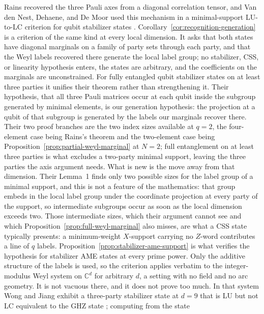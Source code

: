 Rains recovered the three Pauli axes from a diagonal correlation tensor,
and Van den Nest, Dehaene, and De Moor used this mechanism in a
minimal-support LU-to-LC criterion for qubit stabilizer states
\cite[Theorem~13]{Rains1999}
\cite[Theorem~1 and Corollary~1]{VanDenNestDehaeneDeMoor2005}.
Corollary~\ref{cor:recognition-generation} is a criterion of the same kind
at every local dimension.  It asks that both states have diagonal marginals
on a family of party sets through each party, and that the Weyl labels
recovered there generate the local label group; no stabilizer, CSS, or
linearity hypothesis enters, the states are arbitrary, and the coefficients
on the marginals are unconstrained.
For fully entangled qubit stabilizer states on at least three parties it
unifies their theorem rather than strengthening it.  Their hypothesis, that
all three Pauli matrices occur at each qubit inside the subgroup generated
by minimal elements, is our generation hypothesis: the projection at a qubit
of that subgroup is generated by the labels our marginals recover there.
Their two proof branches are the two index sizes available at \(q=2\), the
four-element case being Rains's theorem and the two-element case being
Proposition~\ref{prop:partial-weyl-marginal} at \(N=2\); full entanglement
on at least three parties is what excludes a two-party minimal support,
leaving the three parties the axis argument needs.
What is new is the move away from that dimension.  Their Lemma~1 finds only
two possible sizes for the label group of a minimal support, and this is not
a feature of the mathematics: that group embeds in the local label group
under the coordinate projection at every party of the support, so
intermediate subgroups occur as soon as the local dimension exceeds two.
Those intermediate sizes, which their argument cannot see and which
Proposition~\ref{prop:full-weyl-marginal} also misses, are what a CSS state
typically presents: a minimum-weight \(X\)-support carrying no \(Z\)-word
contributes a line of \(q\) labels.
Proposition~\ref{prop:stabilizer-ame-support} is what verifies the
hypothesis for stabilizer AME states at every prime power.
Only the additive structure of the labels is used, so the criterion applies
verbatim to the integer-modulus Weyl system on \(\mathbb C^d\) for arbitrary
\(d\), a setting with no field and no arc geometry.  It is not vacuous
there, and it does not prove too much.  In that system Wong and Jiang
exhibit a three-party stabilizer state at \(d=9\) that is LU but not LC
equivalent to the GHZ state \cite{WongJiang2025}; computing from the state
